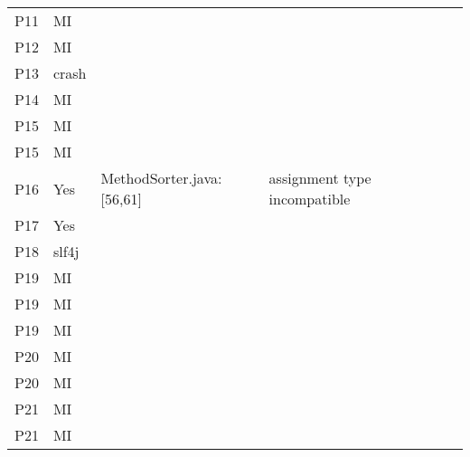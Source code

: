 \begin{table}[]
\begin{tabular}{|p{1.5cm}|p{1cm}|p{3cm}|p{4cm}|p{2cm}|p{1.5cm}|}
        P11 & MI &  &  &  &  \\
        P12 & MI &  &  &  &  \\
        P13 & crash &  &  &  &  \\
        P14 & MI &  &  &  &  \\
        P15 & MI &  &  &  &  \\
        P15 & MI &  &  &  &  \\
        P16 & Yes & MethodSorter.java: [56,61]  & assignment type incompatible &  &  \\
        P17 & Yes &  &  &  &  \\
        P18 & slf4j &  &  &  &  \\
        P19 & MI &  &  &  &  \\
        P19 & MI &  &  &  &  \\
        P19 & MI &  &  &  &  \\
        P20 & MI &  &  &  &  \\
        P20 & MI &  &  &  &  \\
        P21 & MI &  &  &  &  \\
        P21 & MI &  &  &  &  \\ \hline
    \end{tabular}
\end{table}
